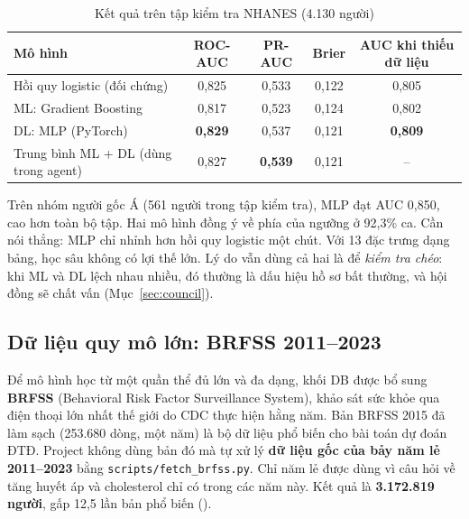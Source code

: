 \begin{table}[H]
\centering
\caption{Kết quả trên tập kiểm tra NHANES (4.130 người)}
\label{tab:dl-metrics}
\small
\begin{tabular}{@{}lcccc@{}}
\toprule
\textbf{Mô hình} & \textbf{ROC-AUC} & \textbf{PR-AUC} & \textbf{Brier} & \textbf{AUC khi thiếu dữ liệu} \\
\midrule
Hồi quy logistic (đối chứng) & 0,825 & 0,533 & 0,122 & 0,805 \\
ML: Gradient Boosting & 0,817 & 0,523 & 0,124 & 0,802 \\
DL: MLP (PyTorch) & \textbf{0,829} & 0,537 & 0,121 & \textbf{0,809} \\
Trung bình ML + DL (dùng trong agent) & 0,827 & \textbf{0,539} & 0,121 & -- \\
\bottomrule
\end{tabular}
\end{table}

Trên nhóm người gốc Á (561 người trong tập kiểm tra), MLP đạt AUC 0,850, cao hơn toàn bộ tập. Hai mô hình đồng ý về phía của ngưỡng ở 92,3\% ca. Cần nói thẳng: MLP chỉ nhỉnh hơn hồi quy logistic một chút. Với 13 đặc trưng dạng bảng, học sâu không có lợi thế lớn. Lý do vẫn dùng cả hai là để \emph{kiểm tra chéo}: khi ML và DL lệch nhau nhiều, đó thường là dấu hiệu hồ sơ bất thường, và hội đồng sẽ chất vấn (Mục~\ref{sec:council}).


\subsection{Dữ liệu quy mô lớn: BRFSS 2011–2023}

Để mô hình học từ một quần thể đủ lớn và đa dạng, khối DB được bổ sung \textbf{BRFSS} (Behavioral Risk Factor Surveillance System), khảo sát sức khỏe qua điện thoại lớn nhất thế giới do CDC thực hiện hằng năm. Bản BRFSS 2015 đã làm sạch (253.680 dòng, một năm) là bộ dữ liệu phổ biến cho bài toán dự đoán ĐTĐ. Project không dùng bản đó mà tự xử lý \textbf{dữ liệu gốc của bảy năm lẻ 2011–2023} bằng \texttt{scripts/fetch\_brfss.py}. Chỉ năm lẻ được dùng vì câu hỏi về tăng huyết áp và cholesterol chỉ có trong các năm này. Kết quả là \textbf{3.172.819 người}, gấp 12,5 lần bản phổ biến ().

